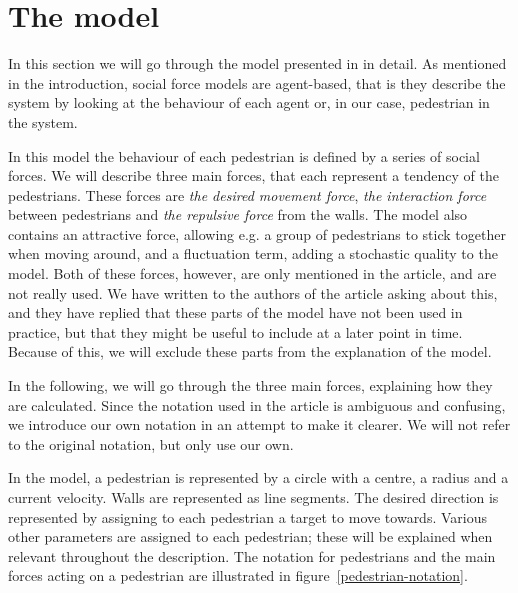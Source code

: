 \section{The model}
\label{sec:the-model}
In this section we will go through the model presented in \cite{self-org} in
detail. As mentioned in the introduction, social force models are agent-based,
that is they describe the system by looking at the behaviour of each agent or,
in our case, pedestrian in the system.


In this model the behaviour of each pedestrian is defined by a series of social
forces. We will describe three main forces, that each represent a tendency of
the pedestrians. These forces are \emph{the desired movement force},
\emph{the interaction force} between pedestrians and \emph{the repulsive
force}  from the walls. The model also contains an attractive force, allowing
e.g. a group of pedestrians to stick together when moving around, and a
fluctuation term, adding a stochastic quality to the model. Both of these forces,
however, are only mentioned in the article, and are not really used. We have
written to the authors of the article asking about this, and they have replied
that these parts of the model have not been used in practice, but that they
might be useful to include at a later point in time.  Because of this, we will
exclude these parts from the explanation of the model.

In the following, we will go through the three main forces, explaining how
they are calculated. Since the notation used in the article is ambiguous and
confusing, we introduce our own notation in an attempt to make it clearer. We
will not refer to the original notation, but only use our own.

In the model, a pedestrian is represented by a circle with a centre, a radius
and a current velocity. Walls are represented as line segments. The desired
direction is represented by assigning to each pedestrian a target to move
towards. Various other parameters are assigned to each pedestrian; these will
be explained when relevant throughout the description. The notation for
pedestrians and the main forces acting on a pedestrian are illustrated in
figure~\ref{pedestrian-notation}.

